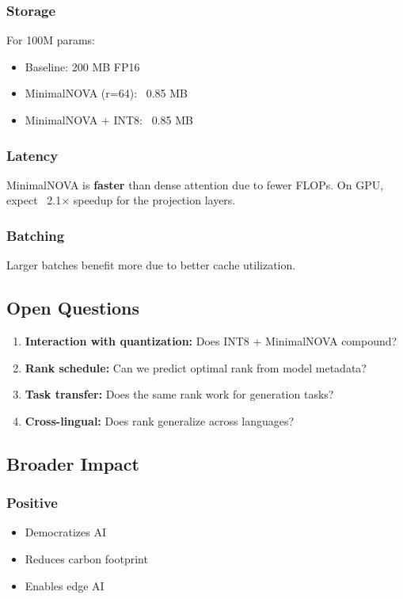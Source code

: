 \subsubsection{Storage}

For 100M params:
\begin{itemize}
\item Baseline: 200 MB FP16
\item MinimalNOVA (r=64): ~0.85 MB
\item MinimalNOVA + INT8: ~0.85 MB

\end{itemize}
\subsubsection{Latency}

MinimalNOVA is \textbf{faster} than dense attention due to fewer FLOPs. 
On GPU, expect ~2.1$\times$ speedup for the projection layers.

\subsubsection{Batching}

Larger batches benefit more due to better cache utilization.

\subsection{Open Questions}

\begin{enumerate}
\item \textbf{Interaction with quantization:} Does INT8 + MinimalNOVA compound?
\item \textbf{Rank schedule:} Can we predict optimal rank from model metadata?
\item \textbf{Task transfer:} Does the same rank work for generation tasks?
\item \textbf{Cross-lingual:} Does rank generalize across languages?

\end{enumerate}
\subsection{Broader Impact}

\subsubsection{Positive}
\begin{itemize}
\item Democratizes AI
\item Reduces carbon footprint
\item Enables edge AI

\end{itemize}

